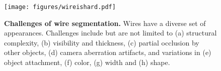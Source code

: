 \begin{figure}[t!]
\centering
\texttt{[image: figures/wireishard.pdf]}
\caption{\textbf{Challenges of wire segmentation.} Wires have a diverse set of appearances. Challenges include but are not limited to (a) structural complexity, (b) visibility and thickness, (c) partial occlusion by other objects, (d) camera aberration artifacts, and variations in (e) object attachment, (f) color, (g) width and (h) shape.
}
\vspace{-5.5mm}
\label{fig:motivation}
\end{figure}